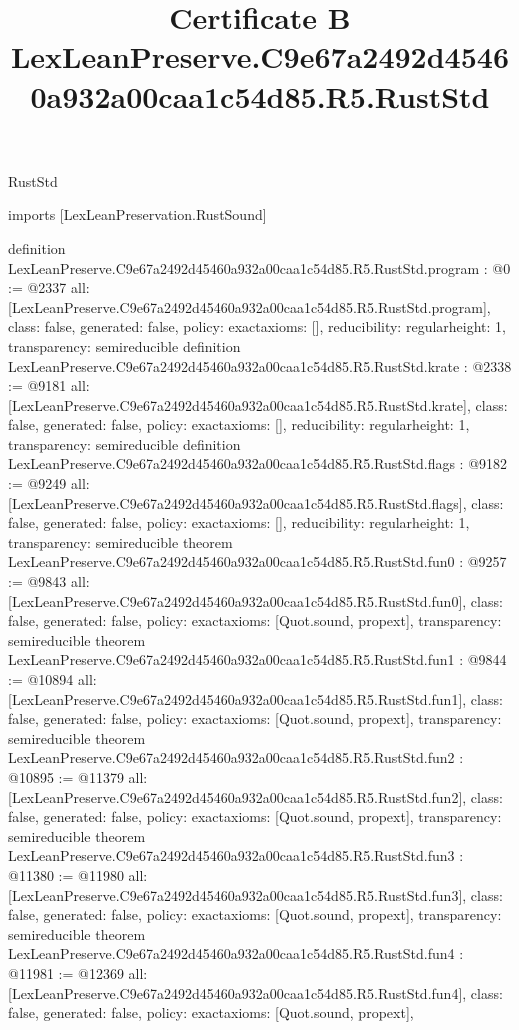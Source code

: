 \begin{lexlean}{RustStd}
\title{Certificate B LexLeanPreserve.C9e67a2492d45460a932a00caa1c54d85.R5.RustStd}
\begin{coremodule}
imports [LexLeanPreservation.RustSound]

definition LexLeanPreserve.C9e67a2492d45460a932a00caa1c54d85.R5.RustStd.program : @0 := @2337 {
  all: [LexLeanPreserve.C9e67a2492d45460a932a00caa1c54d85.R5.RustStd.program],
  class: false,
  generated: false,
  policy: exact{axioms: []},
  reducibility: regular{height: 1},
  transparency: semireducible
}
definition LexLeanPreserve.C9e67a2492d45460a932a00caa1c54d85.R5.RustStd.krate : @2338 := @9181 {
  all: [LexLeanPreserve.C9e67a2492d45460a932a00caa1c54d85.R5.RustStd.krate],
  class: false,
  generated: false,
  policy: exact{axioms: []},
  reducibility: regular{height: 1},
  transparency: semireducible
}
definition LexLeanPreserve.C9e67a2492d45460a932a00caa1c54d85.R5.RustStd.flags : @9182 := @9249 {
  all: [LexLeanPreserve.C9e67a2492d45460a932a00caa1c54d85.R5.RustStd.flags],
  class: false,
  generated: false,
  policy: exact{axioms: []},
  reducibility: regular{height: 1},
  transparency: semireducible
}
theorem LexLeanPreserve.C9e67a2492d45460a932a00caa1c54d85.R5.RustStd.fun0 : @9257 := @9843 {
  all: [LexLeanPreserve.C9e67a2492d45460a932a00caa1c54d85.R5.RustStd.fun0],
  class: false,
  generated: false,
  policy: exact{axioms: [Quot.sound, propext]},
  transparency: semireducible
}
theorem LexLeanPreserve.C9e67a2492d45460a932a00caa1c54d85.R5.RustStd.fun1 : @9844 := @10894 {
  all: [LexLeanPreserve.C9e67a2492d45460a932a00caa1c54d85.R5.RustStd.fun1],
  class: false,
  generated: false,
  policy: exact{axioms: [Quot.sound, propext]},
  transparency: semireducible
}
theorem LexLeanPreserve.C9e67a2492d45460a932a00caa1c54d85.R5.RustStd.fun2 : @10895 := @11379 {
  all: [LexLeanPreserve.C9e67a2492d45460a932a00caa1c54d85.R5.RustStd.fun2],
  class: false,
  generated: false,
  policy: exact{axioms: [Quot.sound, propext]},
  transparency: semireducible
}
theorem LexLeanPreserve.C9e67a2492d45460a932a00caa1c54d85.R5.RustStd.fun3 : @11380 := @11980 {
  all: [LexLeanPreserve.C9e67a2492d45460a932a00caa1c54d85.R5.RustStd.fun3],
  class: false,
  generated: false,
  policy: exact{axioms: [Quot.sound, propext]},
  transparency: semireducible
}
theorem LexLeanPreserve.C9e67a2492d45460a932a00caa1c54d85.R5.RustStd.fun4 : @11981 := @12369 {
  all: [LexLeanPreserve.C9e67a2492d45460a932a00caa1c54d85.R5.RustStd.fun4],
  class: false,
  generated: false,
  policy: exact{axioms: [Quot.sound, propext]},
}
\end{coremodule}
\end{lexlean}
